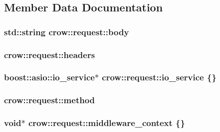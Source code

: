 \subsection{Member Data Documentation}
\hypertarget{structcrow_1_1request_afff683ed63a9e4067683786c3c6218c2}{
\subsubsection[{body}]{\setlength{\rightskip}{0pt plus 5cm}std\-::string crow\-::request\-::body}}\label{structcrow_1_1request_afff683ed63a9e4067683786c3c6218c2}
\hypertarget{structcrow_1_1request_a86d6c2a93b50611c4a5b5643b6da6540}{
\subsubsection[{headers}]{ crow\-::request\-::headers}}\label{structcrow_1_1request_a86d6c2a93b50611c4a5b5643b6da6540}
\hypertarget{structcrow_1_1request_aeb396e1380312b44ebc9646cf73dbb00}{
\subsubsection[{io\-\_\-service}]{\setlength{\rightskip}{0pt plus 5cm}boost\-::asio\-::io\-\_\-service$\ast$ crow\-::request\-::io\-\_\-service \{\}}}\label{structcrow_1_1request_aeb396e1380312b44ebc9646cf73dbb00}
\hypertarget{structcrow_1_1request_a79ac893dd6ad4ec5752dea0cec65ce71}{
\subsubsection[{method}]{ crow\-::request\-::method}}\label{structcrow_1_1request_a79ac893dd6ad4ec5752dea0cec65ce71}
\hypertarget{structcrow_1_1request_a9de0c8721b1c26aab317db0bcdcf1b8a}{
\subsubsection[{middleware\-\_\-context}]{\setlength{\rightskip}{0pt plus 5cm}void$\ast$ crow\-::request\-::middleware\-\_\-context \{\}}}\label{structcrow_1_1request_a9de0c8721b1c26aab317db0bcdcf1b8a}
